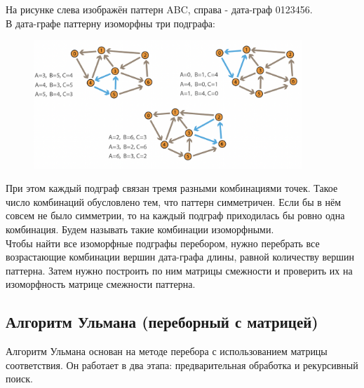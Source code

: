             На рисунке слева изображён паттерн ABC, справа - дата-граф 0123456.\\

            В дата-графе паттерну изоморфны три подграфа:
            \begin{figure}[H]
                    \centering
                    \includegraphics[width=0.9\textwidth]{images/chapter11/subgraph-2.png}
                    \label{fig:images/chapter11/subgraph-2.png}
            \end{figure}
            При этом каждый подграф связан тремя разными комбинациями точек. Такое число комбинаций обусловлено тем, что паттерн симметричен. Если бы в нём совсем не было симметрии, то на каждый подграф приходилась бы ровно одна комбинация. Будем называть такие комбинации изоморфными.\\

            Чтобы найти все изоморфные подграфы перебором, нужно перебрать все возрастающие комбинации вершин дата-графа длины, равной количеству вершин паттерна. Затем нужно построить по ним матрицы смежности и проверить их на изоморфность матрице смежности паттерна.
            
    \subsection{Алгоритм Ульмана (переборный с матрицей)}
        Алгоритм Ульмана основан на методе перебора с использованием матрицы соответствия. Он работает в два этапа: предварительная обработка и рекурсивный поиск.

